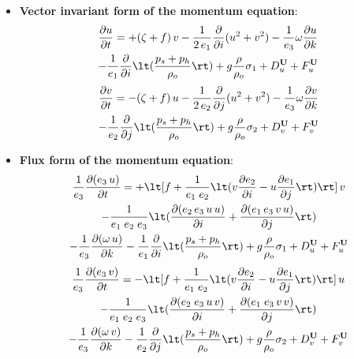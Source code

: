 \documentclass[../main/NEMO_manual]{subfiles}
\begin{document}
\begin{itemize}
\item \textbf{Vector invariant form of the momentum equation}:
  \begin{multline*}
    \pd[u]{t} = + (\zeta + f) \, v - \frac{1}{2 \, e_1} \pd[]{i} (u^2 + v^2) - \frac{1}{e_3} \omega \pd[u]{k} \\
                - \frac{1}{e_1} \pd[]{i} \lt( \frac{p_s + p_h}{\rho_o} \rt) + g \frac{\rho}{\rho_o} \sigma_1
                + D_u^{\vect U} + F_u^{\vect U}
  \end{multline*}
  \begin{multline*}
    \pd[v]{t} = - (\zeta + f) \, u - \frac{1}{2 \, e_2} \pd[]{j}(u^2 + v^2) - \frac{1}{e_3} \omega \pd[v]{k} \\
                - \frac{1}{e_2} \pd[]{j} \lt( \frac{p_s + p_h}{\rho_o} \rt) + g \frac{\rho}{\rho_o} \sigma_2
                + D_v^{\vect U} + F_v^{\vect U}
  \end{multline*}
\item \textbf{Flux form of the momentum equation}:
  \begin{multline*}
    \frac{1}{e_3} \pd[(e_3 \, u)]{t} = + \lt[ f + \frac{1}{e_1 \; e_2} \lt( v \pd[e_2]{i} - u \pd[e_1]{j} \rt) \rt] \, v \\
                                       - \frac{1}{e_1 \; e_2 \; e_3} \lt( \pd[(e_2 \, e_3 \, u \, u)]{i} + \pd[(e_1 \, e_3 \, v \, u)]{j} \rt) \\
                                       - \frac{1}{e_3} \pd[(\omega \, u)]{k}
                                       - \frac{1}{e_1} \pd[]{i} \lt( \frac{p_s + p_h}{\rho_o} \rt)
                                       + g \frac{\rho}{\rho_o} \sigma_1 + D_u^{\vect U} + F_u^{\vect U}
  \end{multline*}
  \begin{multline*}
    \frac{1}{e_3} \pd[(e_3 \, v)]{t} = - \lt[ f + \frac{1}{e_1 \; e_2} \lt( v \pd[e_2]{i} - u \pd[e_1]{j} \rt) \rt] \, u \\
                                       - \frac{1}{e_1 \; e_2 \; e_3} \lt( \pd[( e_2 \; e_3 \, u \, v)]{i} + \pd[(e_1 \; e_3 \, v \, v)]{j} \rt) \\
                                       - \frac{1}{e_3} \pd[(\omega \, v)]{k}
                                       - \frac{1}{e_2} \pd[]{j} \lt( \frac{p_s + p_h}{\rho_o} \rt)
                                       + g \frac{\rho}{\rho_o}\sigma_2 + D_v^{\vect U} + F_v^{\vect U}

\end{multline*}
\end{itemize}
\end{document}
